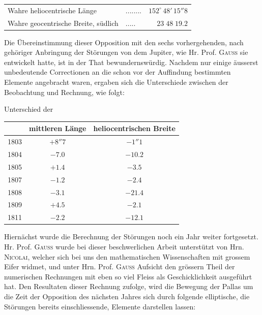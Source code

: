\begin{center}\fontsize{10}{12}\selectfont\setlength{\tabcolsep}{4pt}\renewcommand{\arraystretch}{1.15}\begin{tabular}{llr}
Wahre heliocentrische Länge & .\;.\;.\;.\;.\;.\;.\;. & $152^\circ\,48'\,15''8$\\
Wahre geocentrische Breite, südlich & .\;.\;.\;.\;. & $23\;48\;19.2$\\
\end{tabular}\end{center}

\par\indent Die Übereinstimmung dieser Opposition mit den sechs vorhergehenden, nach gehöriger Anbringung der Störungen von dem Jupiter, wie Hr. Prof. \textsc{Gauss} sie entwickelt hatte, ist in der That bewundernswürdig. Nachdem nur einige äusserst unbedeutende Correctionen an die schon vor der Auffindung bestimmten Elemente angebracht waren, ergaben sich die Unterschiede zwischen der Beobachtung und Rechnung, wie folgt:
\begin{center}\fontsize{10}{12}\selectfont\setlength{\tabcolsep}{4pt}\renewcommand{\arraystretch}{1.15}
Unterschied der

\begin{tabular}{c|c|c}
 & mittleren Länge & heliocentrischen Breite \\
\hline
1803 & $+8''7$ & $-1''1$ \\
1804 & $-7.0$ & $-10.2$ \\
1805 & $+1.4$ & $-3.5$ \\
1807 & $-1.2$ & $-2.4$ \\
1808 & $-3.1$ & $-21.4$ \\
1809 & $+4.5$ & $-2.1$ \\
1811 & $-2.2$ & $-12.1$ \\
\end{tabular}
\end{center}


\par\indent Hiernächst wurde die Berechnung der Störungen noch ein Jahr weiter fortgesetzt. Hr. Prof. \textsc{Gauss} wurde bei dieser beschwerlichen Arbeit unterstützt von Hrn. \textsc{Nicolai}, welcher sich bei uns den mathematischen Wissenschaften mit grossem Eifer widmet, und unter Hrn. Prof. \textsc{Gauss} Aufsicht den grössern Theil der numerischen Rechnungen mit eben so viel Fleiss als Geschicklichkeit ausgeführt hat. Den Resultaten dieser Rechnung zufolge, wird die Bewegung der Pallas um die Zeit der Opposition des nächsten Jahres sich durch folgende elliptische, die Störungen bereits einschliessende, Elemente darstellen lassen:

